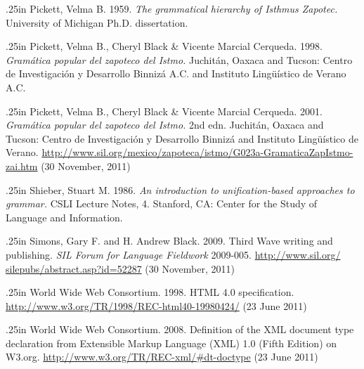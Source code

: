 \documentclass[12pt]{article}
\begin{document}
\hangindent.25in\relax
{}\relax
\fontsize{10}{12}\selectfont \protect\hypertarget{rPickettDiss}{Pickett, Velma B.  1959.  }\textit{The grammatical hierarchy of Isthmus Zapotec.  }University of Michigan Ph.D. dissertation.  \par
\hangindent.25in\relax
{}\relax
\fontsize{10}{12}\selectfont \protect\hypertarget{rPickettBlackMarcial1st}{Pickett, Velma B., Cheryl Black \& Vicente Marcial Cerqueda.  1998.  }\textit{Gramática popular del zapoteco del Istmo.  }Juchitán, Oaxaca and Tucson: Centro de Investigación y Desarrollo Binnizá A.C. and Instituto Lingüístico de Verano A.C.\par
\hangindent.25in\relax
{}\relax
\fontsize{10}{12}\selectfont \protect\hypertarget{rPickettBlackMarcial}{Pickett, Velma B., Cheryl Black \& Vicente Marcial Cerqueda.  2001.  }\textit{Gramática popular del zapoteco del Istmo.  }2nd edn.  Juchitán, Oaxaca and Tucson: Centro de Investigación y Desarrollo Binnizá and Instituto Lingüístico de Verano.  \href{http://www.sil.org/mexico/zapoteca/istmo/G023a-GramaticaZapIstmo-zai.htm}{\textcolor[rgb]{0,0,0}{http://www.sil.org/​mexico/​zapoteca/​istmo/​G023a-GramaticaZapIstmo-zai.htm}}  (30 November, 2011)\par
\hangindent.25in\relax
{}\relax
\fontsize{10}{12}\selectfont \protect\hypertarget{rShieber1986}{Shieber, Stuart M.  1986.  }\textit{An introduction to unification-based approaches to grammar.  }CSLI Lecture Notes, 4. Stanford, CA: Center for the Study of Language and Information.\par
\hangindent.25in\relax
{}\relax
\fontsize{10}{12}\selectfont \protect\hypertarget{rSimonsAndBlackSFLF}{Simons, Gary F. and H. Andrew Black.  2009.  }Third Wave writing and publishing.  \textit{SIL Forum for Language Fieldwork }2009-005.    \href{http://www.sil.org/silepubs/abstract.asp?id=52287}{\textcolor[rgb]{0,0,0}{http://www.sil.org/​silepubs/​abstract.​asp?​id=​52287}}  (30 November, 2011)\par
\hangindent.25in\relax
{}\relax
\fontsize{10}{12}\selectfont \protect\hypertarget{rW3CHTML}{World Wide Web Consortium.  1998.  }HTML 4.0 specification.    \href{http://www.w3.org/TR/1998/REC-html40-19980424/}{\textcolor[rgb]{0,0,0}{http://www.w3.org/TR/​1998/​REC-html40-19980424/}}  (23 June 2011)\par
\hangindent.25in\relax
{}\relax
\fontsize{10}{12}\selectfont \protect\hypertarget{rW3CDTD}{World Wide Web Consortium.  2008.  }Definition of the XML document type declaration from Extensible Markup Language (XML) 1.0 (Fifth Edition) on W3.org.    \href{http://www.w3.org/TR/REC-xml/\#dt-doctype}{\textcolor[rgb]{0,0,0}{http://www.w3.org/​TR/​REC-xml/​\#dt-doctype}}  (23 June 2011)\par 
\end{document}
